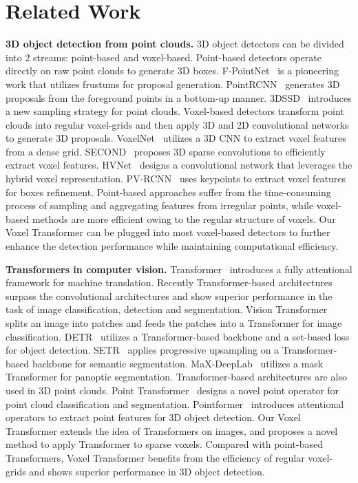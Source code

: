 \documentclass[10pt,twocolumn,letterpaper]{article}
\begin{document}
\section{Related Work}
\noindent\textbf{3D object detection from point clouds.} 3D object detectors can be divided into $2$ streams: point-based and voxel-based. Point-based detectors operate directly on raw point clouds to generate 3D boxes. F-PointNet~\cite{qi2018frustum} is a pioneering work that utilizes frustums for proposal generation. PointRCNN~\cite{shi2019pointrcnn} generates 3D proposals from the foreground points in a bottom-up manner. 3DSSD~\cite{yang20203dssd} introduces a new sampling strategy for point clouds. Voxel-based detectors transform point clouds into regular voxel-grids and then apply 3D and 2D convolutional networks to generate 3D proposals. VoxelNet~\cite{zhou2018voxelnet} utilizes a 3D CNN to extract voxel features from a dense grid. SECOND~\cite{yan2018second} proposes 3D sparse convolutions to efficiently extract voxel features. HVNet~\cite{ye2020hvnet} designs a convolutional network that leverages the hybrid voxel representation. PV-RCNN~\cite{shi2020pv} uses keypoints to extract voxel features for boxes refinement. Point-based approaches suffer from the time-consuming process of sampling and aggregating features from irregular points, while voxel-based methods are more efficient owing to the regular structure of voxels. Our Voxel Transformer can be plugged into most voxel-based detectors to further enhance the detection performance while maintaining computational efficiency.

\noindent\textbf{Transformers in computer vision.} Transformer~\cite{vaswani2017attention} introduces a fully attentional framework for machine translation. Recently Transformer-based architectures surpass the convolutional architectures and show superior performance in the task of image classification, detection and segmentation. Vision Transformer~\cite{dosovitskiy2020image} splits an image into patches and feeds the patches into a Transformer for image classification. DETR~\cite{carion2020end} utilizes a Transformer-based backbone and a set-based loss for object detection. SETR~\cite{zheng2020rethinking} applies progressive upsampling on a Transformer-based backbone for semantic segmentation. MaX-DeepLab~\cite{wang2020max} utilizes a mask Transformer for panoptic segmentation. Transformer-based architectures are also used in 3D point clouds. Point Transformer~\cite{zhao2020point} designs a novel point operator for point cloud classification and segmentation. Pointformer~\cite{pan20203d} introduces attentional operators to extract point features for 3D object detection. Our Voxel Transformer extends the idea of Transformers on images, and proposes a novel method to apply Transformer to sparse voxels. Compared with point-based Transformers, Voxel Transformer benefits from the efficiency of regular voxel-grids and shows superior performance in 3D object detection. 
\end{document}
